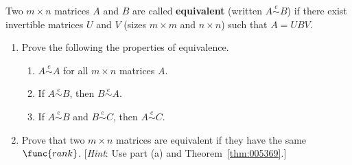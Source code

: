 \begin{multicols}{2}
\begin{ex}
Two $m \times n$ matrices $A$ and $B$ are called \textbf{equivalent} (written $A \overset{e}{\sim} B$) if there exist invertible matrices $U$ and $V$ (sizes $m \times m$ and $n \times n$) such that $A = UBV$.

\begin{enumerate}[label={\alph*.}]
\item Prove the following the properties of equivalence.

\begin{enumerate}[label={\roman*.}]
\item $A \overset{e}{\sim} A$ for all $m \times n$ matrices $A$.

\item If $A \overset{e}{\sim} B$, then $B \overset{e}{\sim} A$.

\item If $A \overset{e}{\sim} B$ and $B \overset{e}{\sim} C$, then $A \overset{e}{\sim} C$.

\end{enumerate}
\item Prove that two $m \times n$ matrices are equivalent if they have the same $\func{rank}$. [\textit{Hint}: Use part (a) and Theorem~\ref{thm:005369}.]

\end{enumerate}
\end{ex}
\end{multicols}
